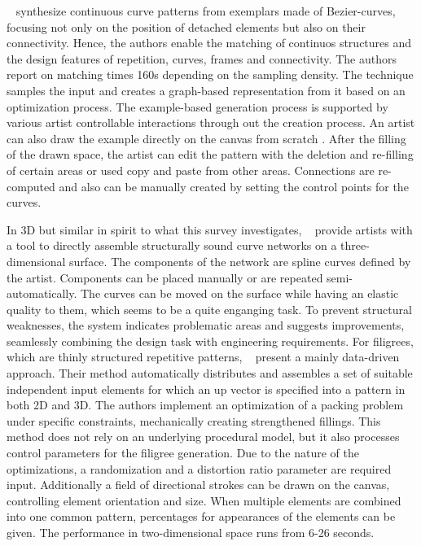 \citeauthor*{tu_2020_cct}~\cite{tu_2020_cct} synthesize continuous curve patterns from exemplars made of Bezier-curves, focusing not only on the position of detached elements but also on their connectivity. Hence, the authors enable the matching of continuos structures and the design features of repetition, curves, frames and connectivity. The authors report on matching times 160s depending on the sampling density. The technique samples the input and creates a graph-based representation from it based on an optimization process. The example-based generation process is supported by various artist controllable interactions through out the creation process. An artist can also draw the example directly on the canvas from scratch . After the filling of the drawn space, the artist can edit the pattern with the deletion and re-filling of certain areas or used copy and paste from other areas. Connections are re-computed and also can be manually created by setting the control points for the curves.

In 3D but similar in spirit to what this survey investigates, \citeauthor*{zehnder_2016_dso}~\cite{zehnder_2016_dso} provide artists with a tool to directly assemble structurally sound curve networks on a three-dimensional surface. The components of the network are spline curves defined by the artist. Components can be placed manually or are repeated semi-automatically. The curves can be moved on the surface while having an elastic quality to them, which seems to be a quite enganging task. To prevent structural weaknesses, the system indicates problematic areas and suggests improvements, seamlessly combining the design task with engineering requirements. For filigrees, which are thinly structured repetitive patterns, \citeauthor*{chen_2016_sof}~\cite{chen_2016_sof} present a mainly data-driven approach. Their method automatically distributes and assembles a set of suitable independent input elements for which an up vector is specified into a pattern in both 2D and 3D. The authors implement an optimization of a packing problem under specific constraints, mechanically creating strengthened fillings. This method does not rely on an underlying procedural model, but it also processes control parameters for the filigree generation. Due to the nature of the optimizations, a randomization and a distortion ratio parameter are required input. Additionally a field of directional strokes can be drawn on the canvas, controlling element orientation and size. When multiple elements are combined into one common pattern, percentages for appearances of the elements can be given. The performance in two-dimensional space runs from 6-26 seconds.

